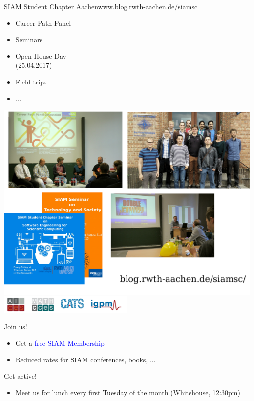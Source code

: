 \documentclass{beamer}
\begin{document}
\begin{frame}{SIAM Student Chapter Aachen}{\url{www.blog.rwth-aachen.de/siamsc}}
  \begin{minipage}{0.5\textwidth}
  \begin{itemize}
    \item Career Path Panel
    \item Seminars
    \item Open House Day\\ (25.04.2017)
    \item Field trips
    \item ...
  \end{itemize}
\end{minipage}
\begin{minipage}{0.48\textwidth}
  \includegraphics[width=\textwidth]{media/Activities.pdf} \\
  \hfill \includegraphics[width=0.5\textwidth]{media/sponsors.pdf}
\end{minipage}

{\Large Join us!}
  \begin{itemize}
    \item Get a \textcolor{blue}{free SIAM Membership}
    \item Reduced rates for SIAM conferences, books, ...
  \end{itemize}

  \vspace{0.5cm}
  {\Large Get active!}
  \begin{itemize}
    \item Meet us for lunch every first Tuesday of the month (Whitehouse, 12:30pm)
  \end{itemize}
\end{frame}
\end{document}
